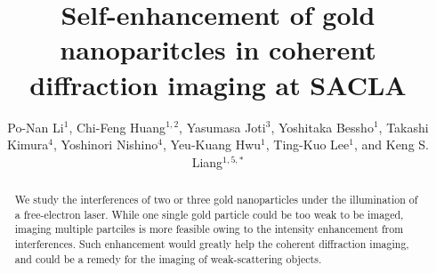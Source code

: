 \documentclass[10pt,letterpaper]{article}
\begin{document}
\title{Self-enhancement of gold nanoparitcles in coherent diffraction imaging at SACLA}

\author{Po-Nan Li$^1$, Chi-Feng Huang$^{1,2}$, Yasumasa Joti$^3$, Yoshitaka Bessho$^1$, 
Takashi Kimura$^4$, Yoshinori Nishino$^4$, Yeu-Kuang Hwu$^1$, Ting-Kuo Lee$^1$, 
and Keng S. Liang$^{1,5,*}$}

\address{$^1$Institute of Physics, Academia Sinica, Taipei 11529, Taiwan\\
	$^2$Department of Applied Chemistry, National Chiao Tung University, Hsinchu 30010, Taiwan\\
	$^3$Japan Synchrotron Radiation Research Institute/SPring-8, Hyogo 679-5198, Japan\\
	$^4$Research Institute for Electronics Science, Hokkaido University, Sapporo 001-0021, Japan\\
	$^5$Department of Electrophysics, National Chiao Tung University, Hsinchu 30010, Taiwan\\
	
	}


	




\begin{abstract}
We study the interferences of two or three gold nanoparticles under the illumination of a free-electron laser. 
While one single gold particle could be too weak to be imaged, imaging multiple partciles is more feasible owing to the intensity enhancement from interferences. 
Such enhancement would greatly help the coherent diffraction imaging, and could be a remedy for the imaging of weak-scattering objects.
\end{abstract}


\end{document}
